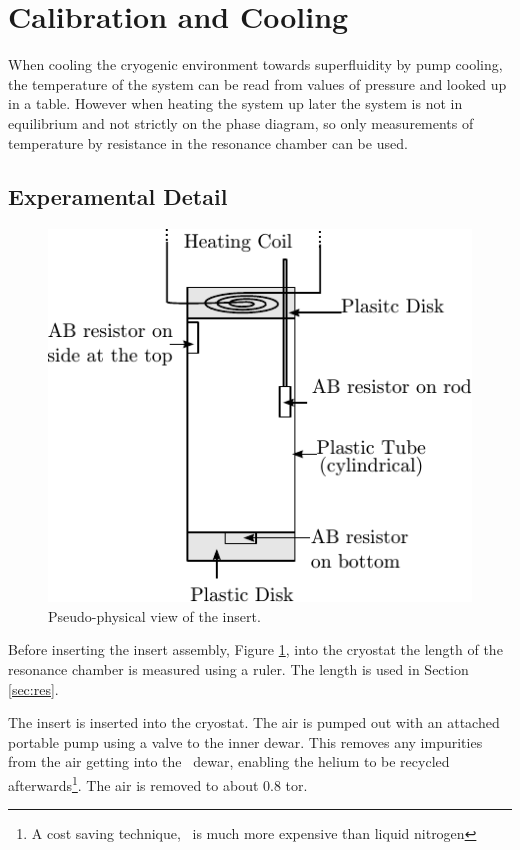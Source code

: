 \section{Calibration and Cooling \label{sec:cal}}

When cooling the cryogenic environment towards superfluidity by
pump cooling, the temperature of the system can be read from
values of pressure and looked up in a table.
However when heating the system up later the system is not in equilibrium
and not strictly on the phase diagram, so only measurements of temperature
by resistance in the resonance chamber can be used.

\subsection{Experamental Detail}

\begin{figure}[htb]
\centering
\includegraphics{pics/pseuphysicsview.pdf}
\caption{Pseudo-physical view of the insert.  \label{fig:pseuphysicsview}}
\end{figure}


Before inserting the insert assembly, Figure \ref{fig:pseuphysicsview}, into the cryostat the length of the resonance
chamber is measured using a ruler.
The length is used in Section \ref{sec:res}.
 
The insert is inserted into the cryostat.
The air is pumped out with an attached portable pump using a valve
to the inner dewar.
This removes any impurities from the air getting into the \he\ dewar,
enabling the helium to be recycled afterwards\footnote{A cost saving technique, \he\ is much 
more expensive than liquid nitrogen}.
The air is removed to about 0.8 tor.

